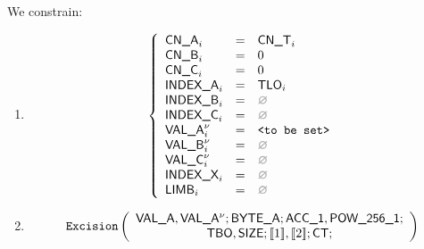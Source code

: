 \begin{center}
\end{center}

We constrain:
\begin{enumerate}
	\item 
		\[
			\left\{ \begin{array}{lclr}
				\cnA      _{i}       & = & \cnT_{i}            \\
				\cnB      _{i}       & = & 0                   \\
				\cnC      _{i}       & = & 0                   \\
				\indexA   _{i}       & = & \tlo_{i}            \\
				\indexB   _{i}       & = & \nothing            \\
				\indexC   _{i}       & = & \nothing            \\
				\valA     _{i}\new{} & = & \valueToBeSet       \\
				\valB     _{i}\new{} & = & \nothing            \\
				\valC     _{i}\new{} & = & \nothing            \\
				\indexX   _{i}       & = & \nothing            \\
				\limb     _{i}       & = & \nothing            \\
			\end{array} \right.
		\]
	\item 
		\[
			\texttt{Excision}
			\left( \begin{array}{c}
				\textsf{VAL\_A}{}, \textsf{VAL\_A}{}^{\nu}{}; \textsf{BYTE\_A}{};
				\textsf{ACC}\textsf{\_1}, \textsf{POW\_256\_1}; \\
				\textsf{TBO}{}, \textsf{SIZE}{};
				[\![1]\!], [\![2]\!]; \textsf{CT}{};
			\end{array} \right)
		\]
\end{enumerate}
